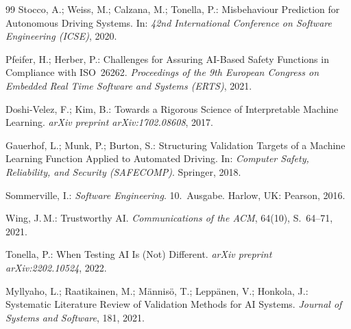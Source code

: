 ﻿\documentclass[12pt,a4paper]{article}
\begin{document}
\begin{thebibliography}{99}
Stocco, A.; Weiss, M.; Calzana, M.; Tonella, P.:
Misbehaviour Prediction for Autonomous Driving Systems.
In: \textit{42nd International Conference on Software Engineering (ICSE)}, 2020.

Pfeifer, H.; Herber, P.:
Challenges for Assuring AI-Based Safety Functions in Compliance with ISO~26262.
\textit{Proceedings of the 9th European Congress on Embedded Real Time Software and Systems (ERTS)}, 2021.

Doshi-Velez, F.; Kim, B.:
Towards a Rigorous Science of Interpretable Machine Learning.
\textit{arXiv preprint arXiv:1702.08608}, 2017.

Gauerhof, L.; Munk, P.; Burton, S.:
Structuring Validation Targets of a Machine Learning Function Applied to Automated Driving.
In: \textit{Computer Safety, Reliability, and Security (SAFECOMP)}.
Springer, 2018.

Sommerville, I.:
\textit{Software Engineering}.
10.~Ausgabe. Harlow, UK: Pearson, 2016.

Wing, J.\,M.:
Trustworthy AI.
\textit{Communications of the ACM}, 64(10), S.~64--71, 2021.

Tonella, P.:
When Testing AI Is (Not) Different.
\textit{arXiv preprint arXiv:2202.10524}, 2022.

Myllyaho, L.; Raatikainen, M.; M\"annis\"o, T.; Lepp\"anen, V.; Honkola, J.:
Systematic Literature Review of Validation Methods for AI Systems.
\textit{Journal of Systems and Software}, 181, 2021.

\end{thebibliography}
\end{document}
